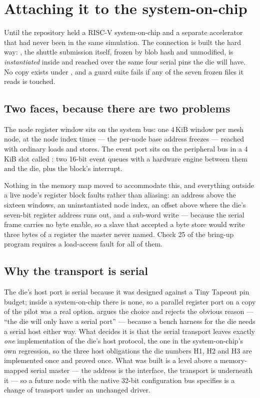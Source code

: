 \section{Attaching it to the system-on-chip}

Until  the repository held a RISC-V system-on-chip and a
separate accelerator that had never been in the same simulation. The
connection is built the hard way: , the
shuttle submission itself, frozen by blob hash and unmodified, is
\emph{instantiated} inside  and reached over the same
four serial pins the die will have. No copy exists under
, and a guard suite fails if any of the seven frozen
files it reads is touched.

\subsection{Two faces, because there are two problems}

The node register window sits on the system bus: one 4\,KiB window per
mesh node, at the node index times  --- the per-node base
address  freezes --- reached with ordinary loads
and stores. The event port sits on the peripheral bus in a 4\,KiB slot
called : two 16-bit event queues with a hardware engine
between them and the die, plus the block's interrupt.

Nothing in the memory map moved to accommodate this, and everything
outside a live node's register block faults rather than aliasing: an
address above the sixteen windows, an uninstantiated node index, an
offset above  where the die's seven-bit register address
runs out, and a sub-word write --- because the serial frame carries no
byte enable, so a slave that accepted a byte store would write three
bytes of a register the master never named. Check 25 of the bring-up
program requires a load-access fault for all of them.

\subsection{Why the transport is serial}

The die's host port is serial because it was designed against a Tiny
Tapeout pin budget; inside a system-on-chip there is none, so a
parallel register port on a copy of the pilot was a real option.
 argues the choice and rejects the obvious reason
--- ``the die will only have a serial port'' --- because a bench
harness for the die needs a serial host either way. What decides it is
that the serial transport leaves exactly \emph{one} implementation of
the die's host protocol, the one in the system-on-chip's own
regression, so the three host obligations the die numbers H1, H2 and H3
are implemented once and proved once. What was built is a level above a
memory-mapped serial master --- the address is the interface, the
transport is underneath it --- so a future node with the native 32-bit
configuration bus  specifies is a change of
transport under an unchanged driver.

